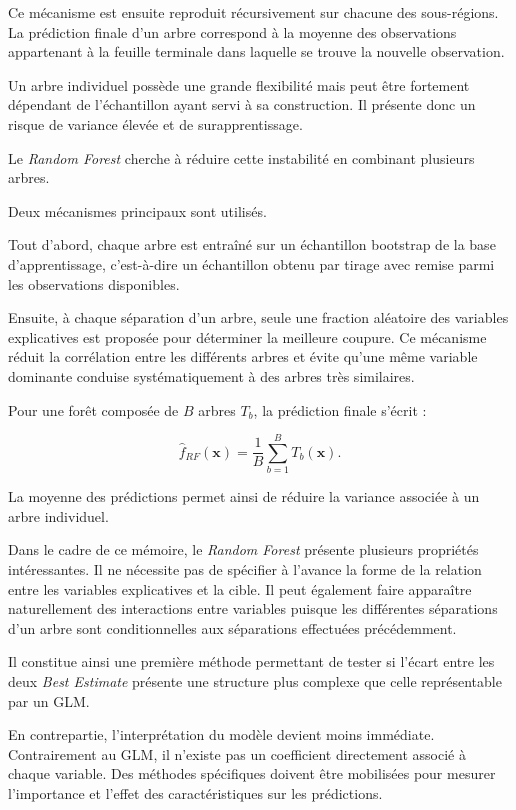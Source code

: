 Ce mécanisme est ensuite reproduit récursivement sur chacune des sous-régions. La prédiction finale d'un arbre correspond à la moyenne des observations appartenant à la feuille terminale dans laquelle se trouve la nouvelle observation.

Un arbre individuel possède une grande flexibilité mais peut être fortement dépendant de l'échantillon ayant servi à sa construction. Il présente donc un risque de variance élevée et de surapprentissage.

Le \textit{Random Forest} cherche à réduire cette instabilité en combinant plusieurs arbres.

Deux mécanismes principaux sont utilisés.

Tout d'abord, chaque arbre est entraîné sur un échantillon bootstrap de la base d'apprentissage, c'est-à-dire un échantillon obtenu par tirage avec remise parmi les observations disponibles.

Ensuite, à chaque séparation d'un arbre, seule une fraction aléatoire des variables explicatives est proposée pour déterminer la meilleure coupure. Ce mécanisme réduit la corrélation entre les différents arbres et évite qu'une même variable dominante conduise systématiquement à des arbres très similaires.

Pour une forêt composée de $B$ arbres $T_b$, la prédiction finale s'écrit :

\begin{equation}
    \widehat{f}_{RF}(\mathbf{x})
    =
    \frac{1}{B}
    \sum_{b=1}^{B}
    T_b(\mathbf{x}).
    \label{eq:rf}
\end{equation}

La moyenne des prédictions permet ainsi de réduire la variance associée à un arbre individuel.

Dans le cadre de ce mémoire, le \textit{Random Forest} présente plusieurs propriétés intéressantes. Il ne nécessite pas de spécifier à l'avance la forme de la relation entre les variables explicatives et la cible. Il peut également faire apparaître naturellement des interactions entre variables puisque les différentes séparations d'un arbre sont conditionnelles aux séparations effectuées précédemment.

Il constitue ainsi une première méthode permettant de tester si l'écart entre les deux \textit{Best Estimate} présente une structure plus complexe que celle représentable par un GLM.

En contrepartie, l'interprétation du modèle devient moins immédiate. Contrairement au GLM, il n'existe pas un coefficient directement associé à chaque variable. Des méthodes spécifiques doivent être mobilisées pour mesurer l'importance et l'effet des caractéristiques sur les prédictions.


